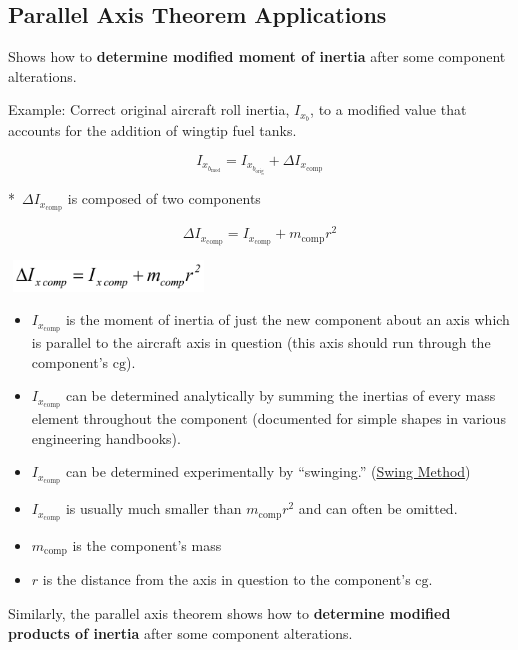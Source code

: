 \documentclass[
]{book}
\providecommand{\tightlist}{%
  \setlength{\itemsep}{0pt}\setlength{\parskip}{0pt}}
\begin{document}
\hypertarget{parallel-axis-theorem-applications}{%
\subsection{Parallel Axis Theorem Applications}\label{parallel-axis-theorem-applications}}

Shows how to \textbf{determine modified moment of inertia} after some component alterations.

Example: Correct original aircraft roll inertia, \(I_{x_b}\), to a modified value that accounts for the addition of wingtip fuel tanks.

\[ I_{x_{b_{\text{mod}}}} = I_{x_{b_{\text{orig}}}} + \Delta I_{x_{\text{comp}}} \]

*~\(\Delta I_{x_{\text{comp}}}\) is composed of two components

\[ \Delta I_{x_{\text{comp}}} = I_{x_{\text{comp}}} + m_{\text{comp}} r^2 \]

\includegraphics[width=2.09028in,height=0.32847in]{media/07/image21.svg}~

\begin{itemize}
\tightlist
\item
  \(I_{x_{\text{comp}}}\) is the moment of inertia of just the new component about an axis which is parallel to the aircraft axis in question (this axis should run through the component's \(\mathrm{cg}\)).
\item
  \(I_{x_{\text{comp}}}\) can be determined analytically by summing the inertias of every mass element throughout the component (documented for simple shapes in various engineering handbooks).
\item
  \(I_{x_{\text{comp}}}\) can be determined experimentally by ``swinging.'' (\protect\hyperlink{swing-method}{Swing Method})
\item
  \(I_{x_{\text{comp}}}\) is usually much smaller than \(m_{\text{comp}} r^2\) and can often be omitted.
\item
  \(m_{\text{comp}}\) is the component's mass
\item
  \(r\) is the distance from the axis in question to the component's \(\mathrm{cg}\).
\end{itemize}

Similarly, the parallel axis theorem shows how to \textbf{determine modified products of inertia} after some component alterations.
\end{document}
